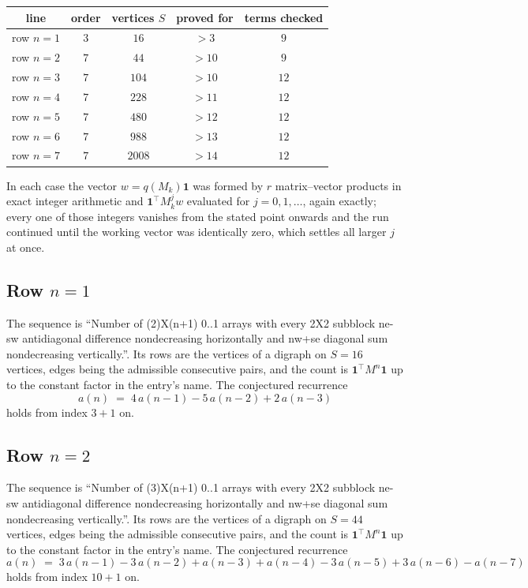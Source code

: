 \documentclass[11pt,a4paper]{article}
\theoremstyle{plain}
\theoremstyle{definition}
\begin{document}
\begin{center}
\begin{tabular}{ccccc}
line & order & vertices $S$ & proved for & terms checked \\ \hline
row $n$$=1$ & $3$ & $16$ & $>3$ & $9$ \\
row $n$$=2$ & $7$ & $44$ & $>10$ & $9$ \\
row $n$$=3$ & $7$ & $104$ & $>10$ & $12$ \\
row $n$$=4$ & $7$ & $228$ & $>11$ & $12$ \\
row $n$$=5$ & $7$ & $480$ & $>12$ & $12$ \\
row $n$$=6$ & $7$ & $988$ & $>13$ & $12$ \\
row $n$$=7$ & $7$ & $2008$ & $>14$ & $12$ \\
\end{tabular}
\end{center}

In each case the vector $w=q(M_k)\mathbf{1}$ was formed by $r$ matrix--vector products in
exact integer arithmetic and $\mathbf{1}^{\!\top}M_k^{j}w$ evaluated for $j=0,1,\dots$,
again exactly; every one of those integers vanishes from the stated point onwards and the run
continued until the working vector was identically zero, which settles all larger $j$ at once.

\subsection*{Row $n$$=1$}
The sequence is ``Number of (2)X(n+1) 0..1 arrays with every 2X2 subblock ne-sw antidiagonal difference nondecreasing horizontally and nw+se diagonal sum nondecreasing vertically.''. Its rows are the vertices of a digraph on
$S=16$ vertices, edges being the admissible consecutive pairs, and the count is
$\mathbf{1}^{\!\top}M^{n}\mathbf{1}$ up to the constant factor in the entry's name.
The conjectured recurrence
\[
a(n)\;=\;4\,a(n-1) - 5\,a(n-2) + 2\,a(n-3)
\]
holds from index $3+1$ on.

\subsection*{Row $n$$=2$}
The sequence is ``Number of (3)X(n+1) 0..1 arrays with every 2X2 subblock ne-sw antidiagonal difference nondecreasing horizontally and nw+se diagonal sum nondecreasing vertically.''. Its rows are the vertices of a digraph on
$S=44$ vertices, edges being the admissible consecutive pairs, and the count is
$\mathbf{1}^{\!\top}M^{n}\mathbf{1}$ up to the constant factor in the entry's name.
The conjectured recurrence
\[
a(n)\;=\;3\,a(n-1) - 3\,a(n-2) + a(n-3) + a(n-4) - 3\,a(n-5) + 3\,a(n-6) - a(n-7)
\]
holds from index $10+1$ on.
\end{document}
